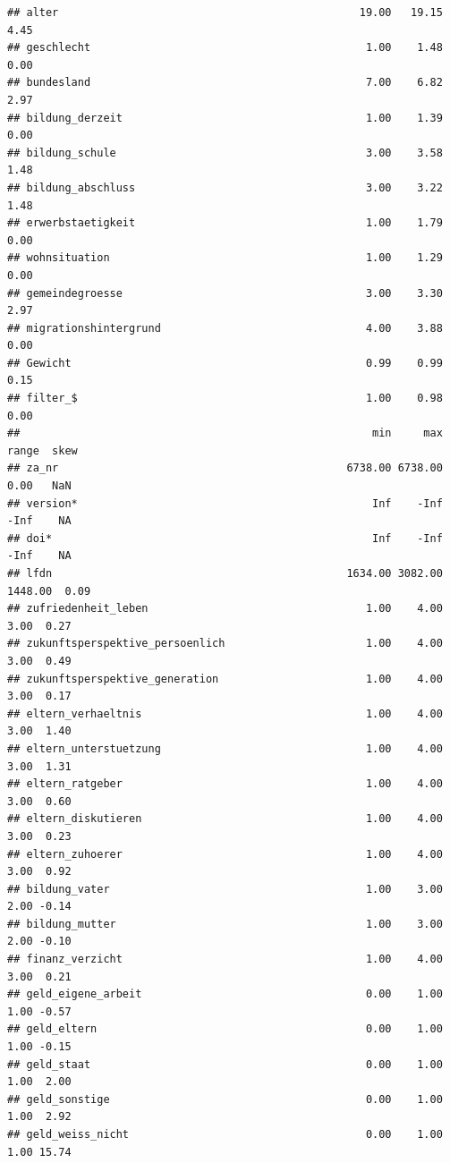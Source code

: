 \documentclass[
]{book}
\begin{document}
\begin{verbatim}
## alter                                               19.00   19.15   4.45
## geschlecht                                           1.00    1.48   0.00
## bundesland                                           7.00    6.82   2.97
## bildung_derzeit                                      1.00    1.39   0.00
## bildung_schule                                       3.00    3.58   1.48
## bildung_abschluss                                    3.00    3.22   1.48
## erwerbstaetigkeit                                    1.00    1.79   0.00
## wohnsituation                                        1.00    1.29   0.00
## gemeindegroesse                                      3.00    3.30   2.97
## migrationshintergrund                                4.00    3.88   0.00
## Gewicht                                              0.99    0.99   0.15
## filter_$                                             1.00    0.98   0.00
##                                                       min     max   range  skew
## za_nr                                             6738.00 6738.00    0.00   NaN
## version*                                              Inf    -Inf    -Inf    NA
## doi*                                                  Inf    -Inf    -Inf    NA
## lfdn                                              1634.00 3082.00 1448.00  0.09
## zufriedenheit_leben                                  1.00    4.00    3.00  0.27
## zukunftsperspektive_persoenlich                      1.00    4.00    3.00  0.49
## zukunftsperspektive_generation                       1.00    4.00    3.00  0.17
## eltern_verhaeltnis                                   1.00    4.00    3.00  1.40
## eltern_unterstuetzung                                1.00    4.00    3.00  1.31
## eltern_ratgeber                                      1.00    4.00    3.00  0.60
## eltern_diskutieren                                   1.00    4.00    3.00  0.23
## eltern_zuhoerer                                      1.00    4.00    3.00  0.92
## bildung_vater                                        1.00    3.00    2.00 -0.14
## bildung_mutter                                       1.00    3.00    2.00 -0.10
## finanz_verzicht                                      1.00    4.00    3.00  0.21
## geld_eigene_arbeit                                   0.00    1.00    1.00 -0.57
## geld_eltern                                          0.00    1.00    1.00 -0.15
## geld_staat                                           0.00    1.00    1.00  2.00
## geld_sonstige                                        0.00    1.00    1.00  2.92
## geld_weiss_nicht                                     0.00    1.00    1.00 15.74

\end{verbatim}
\end{document}
